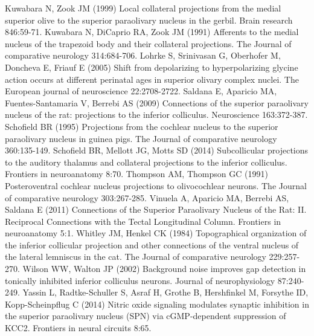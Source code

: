 \documentclass{article}
\begin{document}
Kuwabara N, Zook JM (1999) Local collateral projections from the medial superior olive to the superior paraolivary nucleus in the gerbil. Brain research 846:59-71.
Kuwabara N, DiCaprio RA, Zook JM (1991) Afferents to the medial nucleus of the trapezoid body and their collateral projections. The Journal of comparative neurology 314:684-706.
Lohrke S, Srinivasan G, Oberhofer M, Doncheva E, Friauf E (2005) Shift from depolarizing to hyperpolarizing glycine action occurs at different perinatal ages in superior olivary complex nuclei. The European journal of neuroscience 22:2708-2722.
Saldana E, Aparicio MA, Fuentes-Santamaria V, Berrebi AS (2009) Connections of the superior paraolivary nucleus of the rat: projections to the inferior colliculus. Neuroscience 163:372-387.
Schofield BR (1995) Projections from the cochlear nucleus to the superior paraolivary nucleus in guinea pigs. The Journal of comparative neurology 360:135-149.
Schofield BR, Mellott JG, Motts SD (2014) Subcollicular projections to the auditory thalamus and collateral projections to the inferior colliculus. Frontiers in neuroanatomy 8:70.
Thompson AM, Thompson GC (1991) Posteroventral cochlear nucleus projections to olivocochlear neurons. The Journal of comparative neurology 303:267-285.
Vinuela A, Aparicio MA, Berrebi AS, Saldana E (2011) Connections of the Superior Paraolivary Nucleus of the Rat: II. Reciprocal Connections with the Tectal Longitudinal Column. Frontiers in neuroanatomy 5:1.
Whitley JM, Henkel CK (1984) Topographical organization of the inferior collicular projection and other connections of the ventral nucleus of the lateral lemniscus in the cat. The Journal of comparative neurology 229:257-270.
Wilson WW, Walton JP (2002) Background noise improves gap detection in tonically inhibited inferior colliculus neurons. Journal of neurophysiology 87:240-249.
Yassin L, Radtke-Schuller S, Asraf H, Grothe B, Hershfinkel M, Forsythe ID, Kopp-Scheinpflug C (2014) Nitric oxide signaling modulates synaptic inhibition in the superior paraolivary nucleus (SPN) via cGMP-dependent suppression of KCC2. Frontiers in neural circuits 8:65.
\end{document}
